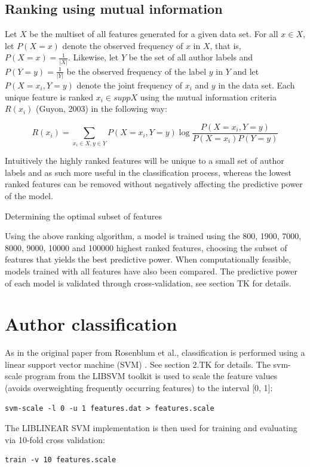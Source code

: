\documentclass[a4paper,11pt]{kth-mag}
\begin{document}
\subsection{Ranking using mutual information}
Let $X$ be the multiset of all features generated for a given data set. For all
$x \in X$, let $P(X = x)$ denote the observed frequency of $x$ in $X$, that is,
$P(X = x) = \frac{1}{|X|}$. Likewise, let $Y$ be the set of all author labels
and $P(Y = y)= \frac{1}{|Y|}$ be the observed frequency of the label $y$ in $Y$
and let $P(X=x_i,Y=y)$ denote the joint frequency of $x_i$ and $y$ in the data
set. Each unique feature is ranked $x_i \in supp X $ using the mutual information
criteria $R(x_i)$ (Guyon, 2003) in the following way:

$$R(x_i)= \sum_{x_i \in X, y \in Y} P(X=x_i,Y=y) \log \frac{P(X = x_i,
Y = y)}{P(X = x_i)P(Y = y)}$$

Intuitively the highly ranked features will be unique to a small set of author
labels and as such more useful in the classification process, whereas the
lowest ranked features can be removed without negatively affecting the
predictive power of the model.
 
Determining the optimal subset of features
 
Using the above ranking algorithm, a model is trained using the 800, 1900, 7000,
8000, 9000, 10000 and 100000 highest ranked features, choosing the subset of
features that yields the best predictive power. When computationally feasible, models
trained with all features have also been compared.
The predictive power of each model is validated through cross-validation, see
section TK for details.

\section{Author classification}
As in the original paper from Rosenblum et al., classification is performed
using a linear support vector machine (SVM) \parencite{rosenblum2011wrote}. See
section 2.TK for details. The svm-scale program from the LIBSVM toolkit is used
\parencite{chang2011libsvm} to scale the feature values (avoids overweighting
frequently occurring features) to the interval [0, 1]:
\begin{lstlisting}
svm-scale -l 0 -u 1 features.dat > features.scale
\end{lstlisting}

The LIBLINEAR SVM implementation is then used \parencite{fan2008liblinear} for
training and evaluating via 10-fold cross validation:
\begin{lstlisting}
train -v 10 features.scale
\end{lstlisting}
\end{document}
